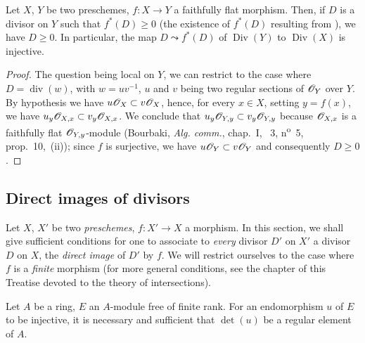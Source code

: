 \begin{proposition}[21.4.8]
\label{IV.21.4.8}
Let $X$, $Y$ be two preschemes, $f:X\to Y$ a faithfully flat morphism.
Then, if $D$ is a divisor on $Y$ such that $f^*(D)\geq 0$ \textup{(the existence of $f^*(D)$ resulting from )}, we have $D\geq 0$.
In particular, the map $D\leadsto f^*(D)$ of $\operatorname{Div}(Y)$ to $\operatorname{Div}(X)$ is injective.
\end{proposition}

\begin{proof}
The question being local on $Y$, we can restrict to the case where $D=\operatorname{div}(w)$, with $w=uv^{-1}$, $u$ and $v$ being two regular sections of $\mathscr{O}_Y$ over $Y$.
By hypothesis we have $u\mathscr{O}_X\subset v\mathscr{O}_X$, hence, for every $x\in X$, setting $y=f(x)$, we have $u_y\mathscr{O}_{X,x}\subset v_y\mathscr{O}_{X,x}$.
We conclude that $u_y\mathscr{O}_{Y,y}\subset v_y\mathscr{O}_{Y,y}$ because $\mathscr{O}_{X,x}$ is a faithfully flat $\mathscr{O}_{Y,y}$-module (Bourbaki, \emph{Alg. comm.}, chap.~I, \textsection~3, n\textsuperscript{o}~5, prop.~10,~(ii));
since $f$ is surjective, we have $u\mathscr{O}_Y\subset v\mathscr{O}_Y$ and consequently $D\geq 0$.
\end{proof}



\subsection{Direct images of divisors}
\label{subsection:IV.21.5}
\label{IV.21.5}

\begin{env}[21.5.1]
\label{IV.21.5.1}
Let $X$, $X'$ be two \emph{preschemes}, $f:X'\to X$ a morphism.
In this section, we shall give sufficient conditions for one to associate to \emph{every} divisor $D'$ on $X'$ a divisor $D$ on $X$, the \emph{direct image} of $D'$ by $f$.
We will restrict ourselves to the case where $f$ is a \emph{finite} morphism (for more general conditions, see the chapter of this Treatise devoted to the theory of intersections).
\end{env}

\begin{lemma}[21.5.2]
\label{IV.21.5.2}
Let $A$ be a ring, $E$ an $A$-module free of finite rank.
For an endomorphism $u$ of $E$ to be injective, it is necessary and sufficient that $\det(u)$ be a regular element of $A$.
\end{lemma}

